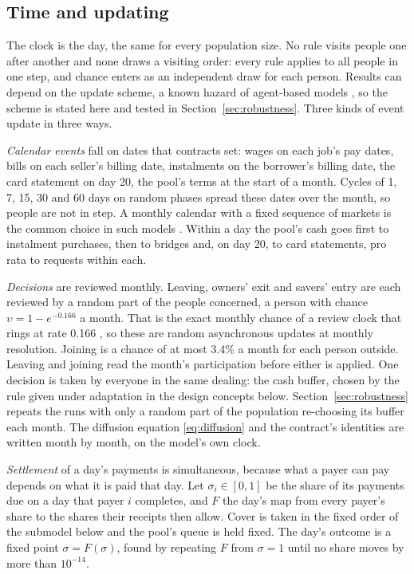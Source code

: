 \subsection{Time and updating}\label{sec:updating}

The clock is the day, the same for every population size. No rule visits people one after another and none draws a
visiting order: every rule applies to all people in one step, and chance enters as an independent draw for each
person. Results can depend on the update scheme, a known hazard of agent-based models
\cite{huberman,axtell}, so the scheme is stated here and tested in Section~\ref{sec:robustness}. Three kinds of event
update in three ways.

\emph{Calendar events} fall on dates that contracts set: wages on each job's pay dates, bills on each seller's
billing date, instalments on the borrower's billing date, the card statement on day 20, the pool's terms at the
start of a month. Cycles of 1, 7, 15, 30 and 60 days on random phases spread these dates over the month, so people
are not in step. A monthly calendar with a fixed sequence of markets is the common choice in such models
\cite{baptista,poledna}. Within a day the pool's cash goes first to instalment purchases, then to bridges and, on
day 20, to card statements, pro rata to requests within each.

\emph{Decisions} are reviewed monthly. Leaving, owners' exit and savers' entry are each reviewed by a random part
of the people concerned, a person with chance $\upsilon = 1 - e^{-0.166}$ a month. That is the exact monthly chance
of a review clock that rings at rate 0.166 \cite{gillespie}, so these are random asynchronous updates at
monthly resolution. Joining is a chance of at most 3.4\% a month for each person outside. Leaving and joining
read the month's participation before either is applied. One decision is taken by everyone in the same dealing:
the cash buffer, chosen by the rule given under adaptation in the design concepts below.
Section~\ref{sec:robustness} repeats the runs with only a random part of the population
re-choosing its buffer each month. The diffusion equation \eqref{eq:diffusion} and the contract's identities are
written month by month, on the model's own clock.

\emph{Settlement} of a day's payments is simultaneous, because what a payer can pay depends on what it is paid
that day. Let $\sigma_{i}\in[0,1]$ be the share of its payments due on a day that payer $i$ completes, and $F$ the day's
map from every payer's share to the shares their receipts then allow. Cover is taken in the fixed order of the
submodel below and the pool's queue is held fixed. The day's outcome is a fixed point $\sigma = F(\sigma)$, found by repeating
$F$ from $\sigma = 1$ until no share moves by more than $10^{-14}$.

